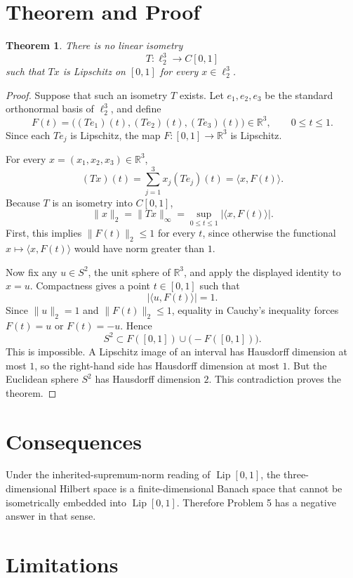 \documentclass[11pt]{article}
\newtheorem{theorem}{Theorem}
\DeclareMathOperator{\Lip}{Lip}
\begin{document}
\section*{Theorem and Proof}

\begin{theorem}
There is no linear isometry
\[
T:\ell_2^3\longrightarrow C[0,1]
\]
such that \(T x\) is Lipschitz on \([0,1]\) for every \(x\in \ell_2^3\).
\end{theorem}

\begin{proof}
Suppose that such an isometry \(T\) exists.  Let \(e_1,e_2,e_3\) be the standard orthonormal basis of \(\ell_2^3\), and define
\[
F(t)=\bigl((Te_1)(t),(Te_2)(t),(Te_3)(t)\bigr)\in \mathbb R^3,\qquad 0\leq t\leq 1.
\]
Since each \(Te_j\) is Lipschitz, the map \(F:[0,1]\to\mathbb R^3\) is Lipschitz.

For every \(x=(x_1,x_2,x_3)\in\mathbb R^3\),
\[
(Tx)(t)=\sum_{j=1}^3 x_j(Te_j)(t)=\langle x,F(t)\rangle.
\]
Because \(T\) is an isometry into \(C[0,1]\),
\[
\|x\|_2=\|Tx\|_\infty
=\sup_{0\leq t\leq 1}|\langle x,F(t)\rangle|.
\]
First, this implies \(\|F(t)\|_2\leq 1\) for every \(t\), since otherwise the functional \(x\mapsto \langle x,F(t)\rangle\) would have norm greater than \(1\).

Now fix any \(u\in S^2\), the unit sphere of \(\mathbb R^3\), and apply the displayed identity to \(x=u\).  Compactness gives a point \(t\in[0,1]\) such that
\[
|\langle u,F(t)\rangle|=1.
\]
Since \(\|u\|_2=1\) and \(\|F(t)\|_2\leq 1\), equality in Cauchy's inequality forces \(F(t)=u\) or \(F(t)=-u\).  Hence
\[
S^2\subset F([0,1])\cup\bigl(-F([0,1])\bigr).
\]
This is impossible.  A Lipschitz image of an interval has Hausdorff dimension at most \(1\), so the right-hand side has Hausdorff dimension at most \(1\).  But the Euclidean sphere \(S^2\) has Hausdorff dimension \(2\).  This contradiction proves the theorem.
\end{proof}

\section*{Consequences}

Under the inherited-supremum-norm reading of \(\Lip[0,1]\), the three-dimensional Hilbert space is a finite-dimensional Banach space that cannot be isometrically embedded into \(\Lip[0,1]\).  Therefore Problem 5 has a negative answer in that sense.

\section*{Limitations}
\end{document}
